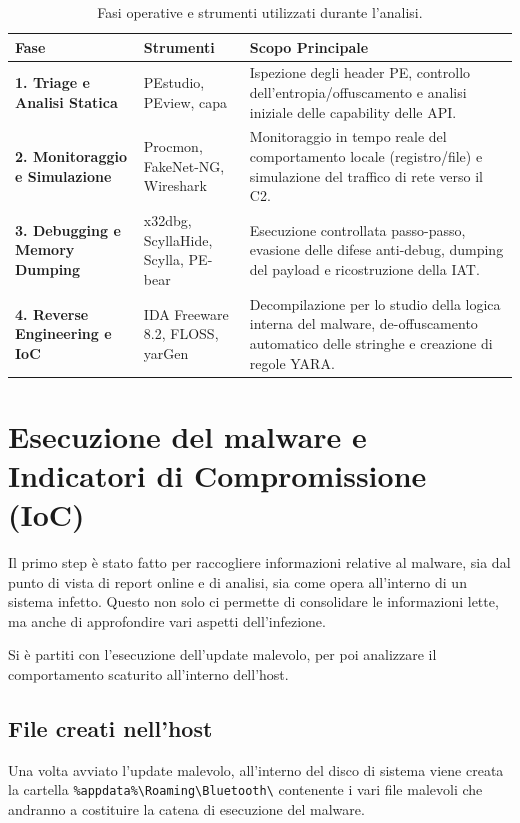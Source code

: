 \begin{table}[H]
\centering
\begin{tabular}{|l|l|p{8cm}|}
\hline
\textbf{Fase} & \textbf{Strumenti} & \textbf{Scopo Principale} \\ \hline
\textbf{1. Triage e Analisi Statica} & PEstudio, PEview, capa & Ispezione degli header PE, controllo dell'entropia/offuscamento e analisi iniziale delle capability delle API. \\ \hline
\textbf{2. Monitoraggio e Simulazione} & Procmon, FakeNet-NG, Wireshark & Monitoraggio in tempo reale del comportamento locale (registro/file) e simulazione del traffico di rete verso il C2. \\ \hline
\textbf{3. Debugging e Memory Dumping} & x32dbg, ScyllaHide, Scylla, PE-bear & Esecuzione controllata passo-passo, evasione delle difese anti-debug, dumping del payload e ricostruzione della IAT. \\ \hline
\textbf{4. Reverse Engineering e IoC} & IDA Freeware 8.2, FLOSS, yarGen & Decompilazione per lo studio della logica interna del malware, de-offuscamento automatico delle stringhe e creazione di regole YARA. \\ \hline
\end{tabular}
\caption{Fasi operative e strumenti utilizzati durante l'analisi.}
\end{table}

\section{Esecuzione del malware e Indicatori di Compromissione (IoC)}
Il primo step è stato fatto per raccogliere informazioni relative al malware, sia dal punto di vista di report online e di analisi, sia come opera all'interno di un sistema infetto. Questo non solo ci permette di consolidare le informazioni lette, ma anche di approfondire vari aspetti dell'infezione.

Si è partiti con l'esecuzione dell'update malevolo, per poi analizzare il comportamento scaturito all'interno dell'host.

\subsection{File creati nell'host}
Una volta avviato l'update malevolo, all'interno del disco di sistema viene creata la cartella \texttt{\%appdata\%\textbackslash Roaming\textbackslash Bluetooth\textbackslash} contenente i vari file malevoli che andranno a costituire la catena di esecuzione del malware.

